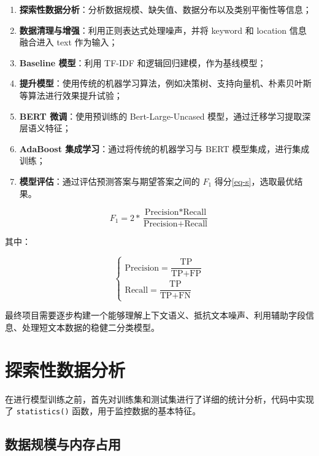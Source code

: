 \documentclass[12pt, a4paper, UTF8]{ctexart}
\begin{document}
\begin{enumerate}
    \item \textbf{探索性数据分析}：分析数据规模、缺失值、数据分布以及类别平衡性等信息；
    \item \textbf{数据清理与增强}：利用正则表达式处理噪声，并将 keyword 和 location 信息融合进入 text 作为输入；
    \item \textbf{Baseline 模型}：利用 TF-IDF 和逻辑回归建模，作为基线模型；
    \item \textbf{提升模型}：使用传统的机器学习算法，例如决策树、支持向量机、朴素贝叶斯等算法进行效果提升试验；
    \item \textbf{BERT 微调}：使用预训练的 Bert-Large-Uncased 模型，通过迁移学习提取深层语义特征；
    \item \textbf{AdaBoost 集成学习}：通过将传统的机器学习与 BERT 模型集成，进行集成训练；
    \item \textbf{模型评估}：通过评估预测答案与期望答案之间的 $F_1$ 得分\autoref{eq-s}，选取最优结果。
\end{enumerate}

\begin{equation}
    F_1=2\ast\dfrac{\text{Precision}\ast\text{Recall}}{\text{Precision}+\text{Recall}} \label{eq-s}
\end{equation}

其中：

\begin{equation}
    \begin{cases}
        \text{Precision}=\dfrac{\text{TP}}{\text{TP}+\text{FP}}
        \\[10pt]
        \text{Recall}=\dfrac{\text{TP}}{\text{TP}+\text{FN}}
    \end{cases}
\end{equation}

最终项目需要逐步构建一个能够理解上下文语义、抵抗文本噪声、利用辅助字段信息、处理短文本数据的稳健二分类模型。



\section{探索性数据分析}
在进行模型训练之前，首先对训练集和测试集进行了详细的统计分析，代码中实现了 \verb|statistics()| 函数，用于监控数据的基本特征。



\subsection{数据规模与内存占用}
\end{document}
